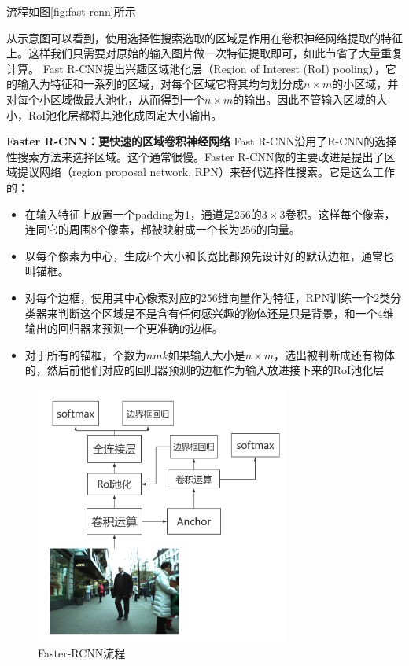 \documentclass[12pt,a4paper,titlepage]{article}
\begin{document}
流程如图\ref{fig:fast-rcnn}所示

从示意图可以看到，使用选择性搜索选取的区域是作用在卷积神经网络提取的特征上。这样我们只需要对原始的输入图片做一次特征提取即可，如此节省了大量重复计算。
Fast R-CNN提出兴趣区域池化层（Region of Interest (RoI) pooling），它的输入为特征和一系列的区域，对每个区域它将其均匀划分成$n \times m$的小区域，并对每个小区域做最大池化，从而得到一个$n\times m$的输出。因此不管输入区域的大小，RoI池化层都将其池化成固定大小输出。

\textbf{Faster R-CNN：更快速的区域卷积神经网络}
Fast R-CNN沿用了R-CNN的选择性搜索方法来选择区域。这个通常很慢。Faster R-CNN做的主要改进是提出了区域提议网络（region proposal network, RPN）来替代选择性搜索。它是这么工作的：
\begin{itemize}
\item 在输入特征上放置一个padding为1，通道是256的$3\times 3$卷积。这样每个像素，连同它的周围8个像素，都被映射成一个长为256的向量。
\item 以每个像素为中心，生成$k$个大小和长宽比都预先设计好的默认边框，通常也叫锚框。
\item 对每个边框，使用其中心像素对应的256维向量作为特征，RPN训练一个2类分类器来判断这个区域是不是含有任何感兴趣的物体还是只是背景，和一个4维输出的回归器来预测一个更准确的边框。
\item 对于所有的锚框，个数为$nmk$如果输入大小是$n\times m$，选出被判断成还有物体的，然后前他们对应的回归器预测的边框作为输入放进接下来的RoI池化层
\end{itemize}

\begin{figure}[h]
\centering
\includegraphics[height=8.5cm]{img/faster-rcnn.png}
\caption{Faster-RCNN流程}
\label{fig:faster-rcnn}
\end{figure}
\end{document}
